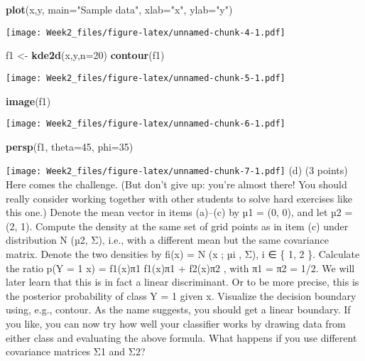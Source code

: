\documentclass[]{article}
\newenvironment{Shaded}{\begin{snugshade}}{\end{snugshade}}
\newcommand{\DataTypeTok}[1]{\textcolor[rgb]{0.13,0.29,0.53}{#1}}
\newcommand{\DecValTok}[1]{\textcolor[rgb]{0.00,0.00,0.81}{#1}}
\newcommand{\KeywordTok}[1]{\textcolor[rgb]{0.13,0.29,0.53}{\textbf{#1}}}
\newcommand{\NormalTok}[1]{#1}
\newcommand{\StringTok}[1]{\textcolor[rgb]{0.31,0.60,0.02}{#1}}
\begin{document}
\begin{Shaded}
\begin{Highlighting}[]
\KeywordTok{plot}\NormalTok{(x,y, }\DataTypeTok{main=}\StringTok{"Sample data"}\NormalTok{, }\DataTypeTok{xlab=}\StringTok{"x"}\NormalTok{, }\DataTypeTok{ylab=}\StringTok{"y"}\NormalTok{)}
\end{Highlighting}
\end{Shaded}

\texttt{[image: Week2\_files/figure-latex/unnamed-chunk-4-1.pdf]}

\begin{Shaded}
\begin{Highlighting}[]
\NormalTok{f1 <-}\StringTok{ }\KeywordTok{kde2d}\NormalTok{(x,y,}\DataTypeTok{n=}\DecValTok{20}\NormalTok{)}
\KeywordTok{contour}\NormalTok{(f1)}
\end{Highlighting}
\end{Shaded}

\texttt{[image: Week2\_files/figure-latex/unnamed-chunk-5-1.pdf]}

\begin{Shaded}
\begin{Highlighting}[]
\KeywordTok{image}\NormalTok{(f1)}
\end{Highlighting}
\end{Shaded}

\texttt{[image: Week2\_files/figure-latex/unnamed-chunk-6-1.pdf]}

\begin{Shaded}
\begin{Highlighting}[]
\KeywordTok{persp}\NormalTok{(f1, }\DataTypeTok{theta=}\DecValTok{45}\NormalTok{, }\DataTypeTok{phi=}\DecValTok{35}\NormalTok{)}
\end{Highlighting}
\end{Shaded}

\texttt{[image: Week2\_files/figure-latex/unnamed-chunk-7-1.pdf]} (d) (3
points) Here comes the challenge. (But don't give up: you're almost
there! You should really consider working together with other students
to solve hard exercises like this one.) Denote the mean vector in items
(a)--(c) by µ1 = (0, 0), and let µ2 = (2, 1). Compute the density at the
same set of grid points as in item (c) under distribution N (µ2, Σ),
i.e., with a different mean but the same covariance matrix. Denote the
two densities by fi(x) = N (x ; µi , Σ), i ∈ \{ 1, 2 \}. Calculate the
ratio p(Y = 1 \textbar{} x) = f1(x)π1 f1(x)π1 + f2(x)π2 , with π1 = π2 =
1/2. We will later learn that this is in fact a linear discriminant. Or
to be more precise, this is the posterior probability of class Y = 1
given x. Visualize the decision boundary using, e.g., contour. As the
name suggests, you should get a linear boundary. If you like, you can
now try how well your classifier works by drawing data from either class
and evaluating the above formula. What happens if you use different
covariance matrices Σ1 and Σ2?
\end{document}
